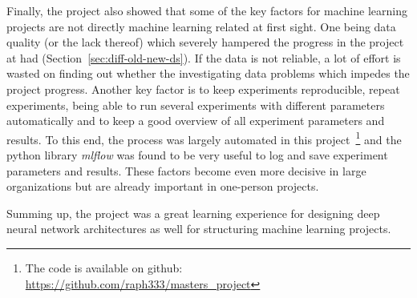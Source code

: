 Finally, the project also showed that some of the key factors for machine learning projects are not directly machine learning related at first sight. One being data quality (or the lack thereof) which severely hampered the progress in the project at had (Section~\ref{sec:diff-old-new-ds}). If the data is not reliable, a lot of effort is wasted on finding out whether the investigating data problems which impedes the project progress. Another key factor is to keep experiments reproducible, repeat experiments, being able to run several experiments with different parameters automatically and to keep a good overview of all experiment parameters and results. To this end, the process was largely automated in this project~\footnote{The code is available on github: \url{https://github.com/raph333/masters_project}} and the python library \textit{mlflow} was found to be very useful to log and save experiment parameters and results. These factors become even more decisive in large organizations but are already important in one-person projects.

Summing up, the project was a great learning experience for designing deep neural network architectures as well for structuring machine learning projects.